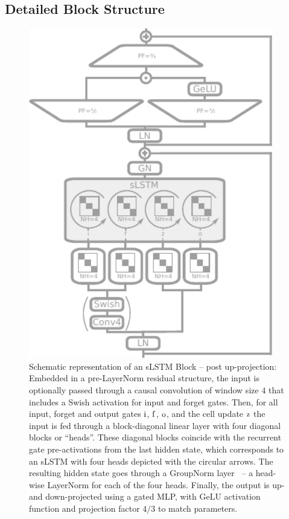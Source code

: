 \documentclass[dvipsnames]{article}
\begin{document}
\begin{appendix}
\subsection{Detailed Block Structure}
\begin{figure}[H]
\centering
\includegraphics[width=0.95\textwidth]{figures/desc_slstm_block_detail2.pdf}
\caption{Schematic representation of an sLSTM Block -- post up-projection: Embedded in a pre-LayerNorm residual structure, the input is optionally passed through a causal convolution of window size $4$ that includes a Swish activation for input and forget gates. Then, for all input, forget and output gates $\mathrm{i}$, $\mathrm{f}$, $\mathrm{o}$, and the cell update $\mathrm{z}$ the input is fed through a block-diagonal linear layer with four diagonal blocks or ``heads''. These diagonal blocks coincide with the recurrent gate pre-activations from the last hidden state, which corresponds to an sLSTM with four heads depicted with the circular arrows. The resulting hidden state goes through a GroupNorm layer~\citep{Wu:2018} -- a head-wise LayerNorm for each of the four heads. Finally, the output is up- and down-projected using a gated MLP, with GeLU activation function and projection factor $4 / 3$ to match parameters.}
\label{fig:appsLSTM_detailed}
\end{figure}


\end{appendix}
\end{document}
